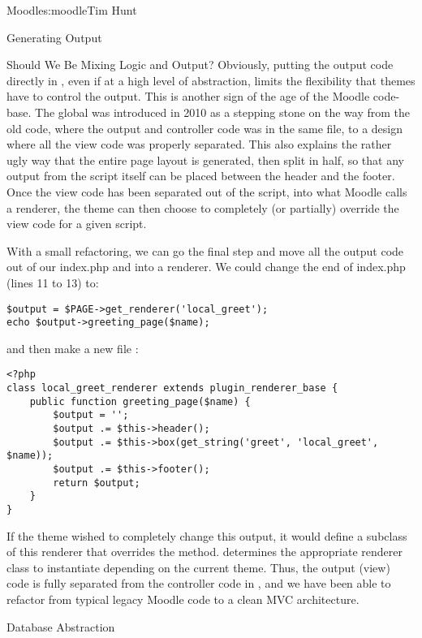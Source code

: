 \begin{aosachapter}{Moodle}{s:moodle}{Tim Hunt}
\begin{aosasect1}{Generating Output}
\begin{aosasect2}{Should We Be Mixing Logic and Output?}
Obviously, putting the output code directly in , even
if at a high level of abstraction, limits the flexibility that themes
have to control the output. This is another sign of the age of the
Moodle code-base. The  global was introduced in 2010 as
a stepping stone on the way from the old code, where the output and
controller code was in the same file, to a design where all the view
code was properly separated. This also explains the rather ugly way
that the entire page layout is generated, then split in half, so that
any output from the script itself can be placed between the header and
the footer. Once the view code has been separated out of the script,
into what Moodle calls a renderer, the theme can then choose to
completely (or partially) override the view code for a given script.

With a small refactoring, we can go the final step and move all the
output code out of our index.php and into a renderer. We could change
the end of index.php (lines 11 to 13) to:

\begin{verbatim}
$output = $PAGE->get_renderer('local_greet');
echo $output->greeting_page($name);
\end{verbatim}

and then make a new file :

\begin{verbatim}
<?php
class local_greet_renderer extends plugin_renderer_base {
    public function greeting_page($name) {
        $output = '';
        $output .= $this->header();
        $output .= $this->box(get_string('greet', 'local_greet', $name));
        $output .= $this->footer();
        return $output;
    }
}
\end{verbatim}

If the theme wished to completely change this output, it would define
a subclass of this renderer that overrides the 
method.  determines the
appropriate renderer class to instantiate depending on the current
theme. Thus, the output (view) code is fully separated from the
controller code in , and we have been able to refactor
from typical legacy Moodle code to a clean MVC architecture.

\end{aosasect2}

\end{aosasect1}

\begin{aosasect1}{Database Abstraction}


\end{aosasect1}
\end{aosachapter}
